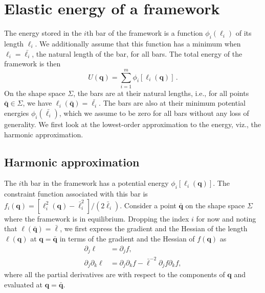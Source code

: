 \section{Elastic energy of a framework}
\label{sec:energy}

The energy stored in the $i$th bar of the framework is a function $\phi_i(\ell_i)$ of its length $\ell_i$.
We additionally assume that this function has a minimum when $\ell_i = \bar{\ell_i}$, the natural length of the bar, for all bars.
The total energy of the framework is then
%
\begin{equation}
  U({\bm{q}}) = \sum_{i=1}^{m} \phi_i[\ell_i({\bm{q}})]\,.
\end{equation}
%
On the shape space $\Sigma$, the bars are at their natural lengths, i.e., for all points $\bar{\bm{q}} \in \Sigma$, we have $\ell_i(\bar{\bm{q}}) = \bar{\ell_i}$.
The bars are also at their minimum potential energies $\phi_i(\bar{\ell_i})$, which we assume to be zero for all bars without any loss of generality.
We first look at the lowest-order approximation to the energy, viz., the harmonic approximation.

\subsection{Harmonic approximation}

The $i$th bar in the framework has a potential energy $\phi_i[\ell_i(\bm{q})]$.
The constraint function associated with this bar is $f_i(\bm{q}) = [\ell_i^2(\bm{q}) - \bar{\ell}_i^2]/(2\bar{\ell}_i)$.
Consider a point $\bar{\bm{q}}$ on the shape space $\Sigma$ where the framework is in equilibrium.
Dropping the index $i$ for now and noting that $\ell(\bar{\bm{q}}) = \bar{\ell}$, we first express the gradient and the Hessian of the length $\ell(\bm{q})$ at $\bm{q} = \bar{\bm{q}}$ in terms of the gradient and the Hessian of $f(\bm{q})$ as
%
\begin{equation}
\begin{aligned}
  \partial_j \ell &= \partial_j f,\\
  \partial_j\partial_k \ell &= \partial_j\partial_k f - \bar{\ell}^{-2}\partial_j f\partial_k f,
  \label{sm:eq:lentomap}
\end{aligned}
\end{equation}
%
where all the partial derivatives are with respect to the components of $\bm{q}$ and evaluated at $\bm{q} = \bar{\bm{q}}$.

